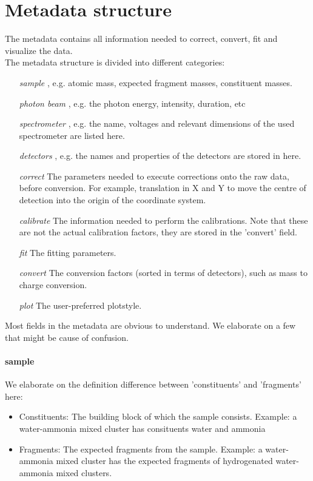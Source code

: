\section{Metadata structure}
The metadata contains all information needed to correct, convert, fit and visualize the data.
\\
The metadata structure is divided into different categories:
\begin{itemize}
\item[\emph{sample}], e.g. atomic mass, expected fragment masses, constituent masses.
\item[\emph{photon beam}], e.g. the photon energy, intensity, duration, etc
\item[\emph{spectrometer}],  e.g. the name, voltages and relevant dimensions of the used spectrometer are listed here.
\item[\emph{detectors}], e.g. the names and properties of the detectors are stored in here.
\item[\emph{correct}] The parameters needed to execute corrections onto the raw data, before conversion. For example, translation in X and Y to move the centre of detection into the origin of the coordinate system.
\item[\emph{calibrate}] The information needed to perform the calibrations. Note that these are not the actual calibration factors, they are stored in the 'convert' field.
\item[\emph{fit}] The fitting parameters.
\item[\emph{convert}] The conversion factors (sorted in terms of detectors), such as mass to charge conversion.
\item[\emph{plot}] The user-preferred plotstyle.
\end{itemize}

Most fields in the metadata are obvious to understand. We elaborate on a few that might be cause of confusion.

\paragraph{sample}
 We elaborate on the definition difference between 'constituents' and 'fragments' here:
\begin{itemize}
\item Constituents: The building block of which the sample consists. Example: a water-ammonia mixed cluster has consituents water and ammonia
\item Fragments: The expected fragments from the sample. Example: a water-ammonia mixed cluster has the expected fragments of hydrogenated water-ammonia mixed clusters.
\end{itemize}


